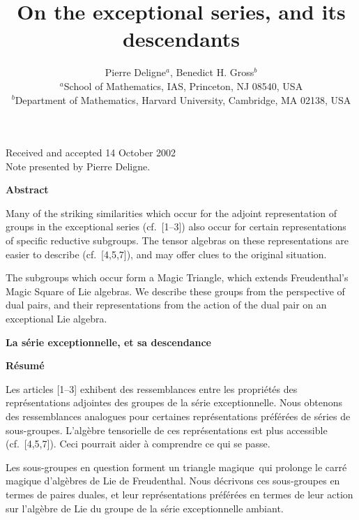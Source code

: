 \documentclass[11pt,a4paper]{article}
\title{On the exceptional series, and its descendants}
\author{Pierre Deligne$^{a}$, Benedict H. Gross$^{b}$\\
\small $^{a}$School of Mathematics, IAS, Princeton, NJ 08540, USA\\
\small $^{b}$Department of Mathematics, Harvard University, Cambridge, MA 02138, USA}
\date{}
\begin{document}
\maketitle

\begin{center}
\small Received and accepted 14 October 2002\\
\small Note presented by Pierre Deligne.
\end{center}

\bigskip
\noindent\textbf{Abstract}

\medskip
\noindent
Many of the striking similarities which occur for the adjoint representation of groups in the exceptional series (cf.~[1--3]) also occur for certain representations of specific reductive subgroups. The tensor algebras on these representations are easier to describe (cf.~[4,5,7]), and may offer clues to the original situation.

The subgroups which occur form a Magic Triangle, which extends Freudenthal's Magic Square of Lie algebras. We describe these groups from the perspective of dual pairs, and their representations from the action of the dual pair on an exceptional Lie algebra.

\bigskip
{}
\noindent\textbf{La s\'{e}rie exceptionnelle, et sa descendance}

\medskip
\noindent\textbf{R\'{e}sum\'{e}}

\medskip
\noindent
Les articles [1--3] exhibent des ressemblances entre les propri\'{e}t\'{e}s des repr\'{e}sentations adjointes des groupes de la s\'{e}rie exceptionnelle. Nous obtenons des ressemblances analogues pour certaines repr\'{e}sentations pr\'{e}f\'{e}r\'{e}es de s\'{e}ries de sous-groupes. L'alg\`{e}bre tensorielle de ces repr\'{e}sentations est plus accessible (cf.~[4,5,7]). Ceci pourrait aider \`{a} comprendre ce qui se passe.

Les sous-groupes en question forment un \guillemotleft triangle magique\guillemotright\ qui prolonge le carr\'{e} magique d'alg\`{e}bres de Lie de Freudenthal. Nous d\'{e}crivons ces sous-groupes en termes de paires duales, et leur repr\'{e}sentations pr\'{e}f\'{e}r\'{e}es en termes de leur action sur l'alg\`{e}bre de Lie du groupe de la s\'{e}rie exceptionnelle ambiant.
\end{document}
